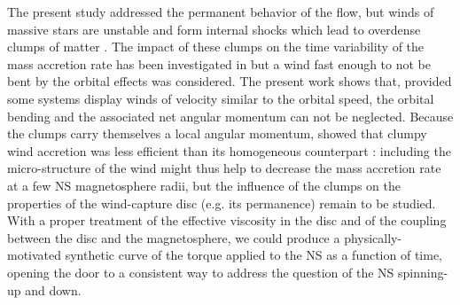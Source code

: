 \documentclass{aa}
\makeatletter
\newcommand{\sgx}{SgXB\xspace}
\newcommand*{\hmxb}{HMXB\@\xspace}
\newcommand*{\ns}{NS\@\xspace}
\newcommand*{\eg}{e.g.\@\xspace}
\newcommand*{\ie}{i.e.\@\xspace}
\makeatother
\begin{document}
The present study addressed the permanent behavior of the flow, but winds of massive stars are unstable and form internal shocks which lead to overdense clumps of matter \citep{Owocki1984,Sundqvist2017}. The impact of these clumps on the time variability of the mass accretion rate has been investigated in \cite{ElMellah} but a wind fast enough to not be bent by the orbital effects was considered. The present work shows that, provided some systems display winds of velocity similar to the orbital speed, the orbital bending and the associated net angular momentum can not be neglected. Because the clumps carry themselves a local angular momentum, \cite{ElMellah} showed that clumpy wind accretion was less efficient than its homogeneous counterpart : including the micro-structure of the wind might thus help to decrease the mass accretion rate at a few \ns magnetosphere radii, but the influence of the clumps on the properties of the wind-capture disc (\eg its permanence) remain to be studied. With a proper treatment of the effective viscosity in the disc and of the coupling between the disc and the magnetosphere, we could produce a physically-motivated synthetic curve of the torque applied to the \ns as a function of time, opening the door to a consistent way to address the question of the \ns spinning-up and down.




\end{document}
